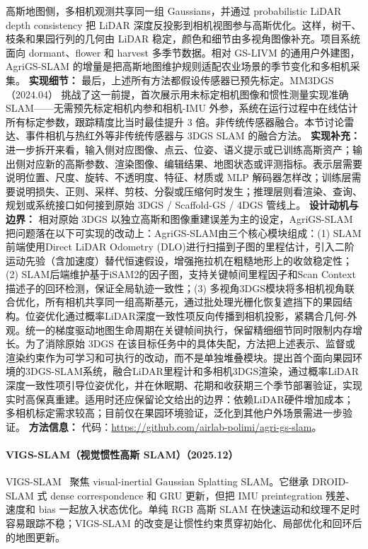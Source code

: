 高斯地图侧，多相机观测共享同一组 Gaussians，并通过 probabilistic LiDAR depth consistency 把 LiDAR 深度反投影到相机视图参与高斯优化。这样，树干、枝条和果园行列的几何由 LiDAR 稳定，颜色和细节由多视角图像补充。项目系统面向 dormant、flower 和 harvest 多季节数据。相对 GS-LIVM 的通用户外建图，AgriGS-SLAM 的增量是把高斯地图维护规则适配农业场景的季节变化和多相机采集。
\textbf{实现细节：} 最后，上述所有方法都假设传感器已预先标定。MM3DGS（2024.04） 挑战了这一前提，首次展示用未标定相机图像和惯性测量实现准确 SLAM——无需预先标定相机内参和相机-IMU 外参，系统在运行过程中在线估计所有标定参数，跟踪精度比当时最佳提升 3 倍。非传统传感器融合。本节讨论雷达、事件相机与热红外等非传统传感器与 3DGS SLAM 的融合方法。
\textbf{实现补充：} 进一步拆开来看，输入侧对应图像、点云、位姿、语义提示或已训练高斯资产；输出侧对应新的高斯参数、渲染图像、编辑结果、地图状态或评测指标。表示层需要说明位置、尺度、旋转、不透明度、特征、材质或 MLP 解码器怎样改；训练层需要说明损失、正则、采样、剪枝、分裂或压缩何时发生；推理层则看渲染、查询、规划或系统接口如何接到原始 3DGS / Scaffold-GS / 4DGS 管线上。
\textbf{设计动机与边界：} 相对原始 3DGS 以独立高斯和图像重建误差为主的设定，AgriGS-SLAM 把问题落在以下可实现的改动上：AgriGS-SLAM由三个核心模块组成：(1) SLAM前端使用Direct LiDAR Odometry (DLO)进行扫描到子图的里程估计，引入二阶运动先验（含加速度）替代恒速假设，增强拖拉机在粗糙地形上的收敛稳定性；(2) SLAM后端维护基于iSAM2的因子图，支持关键帧间里程因子和Scan Context描述子的回环检测，保证全局轨迹一致性；(3) 多视角3DGS模块将多相机视角联合优化，所有相机共享同一组高斯基元，通过批处理光栅化恢复遮挡下的果园结构。位姿优化通过概率LiDAR深度一致性项反向传播到相机投影，紧耦合几何-外观。统一的梯度驱动地图生命周期在关键帧间执行，保留精细细节同时限制内存增长。为了消除原始 3DGS 在该目标任务中的具体失配，方法把上述表示、监督或渲染约束作为可学习和可执行的改动，而不是单独堆叠模块。提出首个面向果园环境的3DGS-SLAM系统，融合LiDAR里程计和多相机3DGS渲染，通过概率LiDAR深度一致性项引导位姿优化，并在休眠期、花期和收获期三个季节部署验证，实现实时高保真重建。适用时还应保留论文给出的边界：依赖LiDAR硬件增加成本；多相机标定需求较高；目前仅在果园环境验证，泛化到其他户外场景需进一步验证。
\textbf{方法信息：} 代码：\url{https://github.com/airlab-polimi/agri-gs-slam}。
\paragraph{VIGS-SLAM（视觉惯性高斯 SLAM）（2025.12）}
VIGS-SLAM~\cite{2512_02293} 聚焦 visual-inertial Gaussian Splatting SLAM。它继承 DROID-SLAM 式 dense correspondence 和 GRU 更新，但把 IMU preintegration 残差、速度和 bias 一起放入状态优化。单纯 RGB 高斯 SLAM 在快速运动和纹理不足时容易跟踪不稳；VIGS-SLAM 的改变是让惯性约束贯穿初始化、局部优化和回环后的地图更新。

